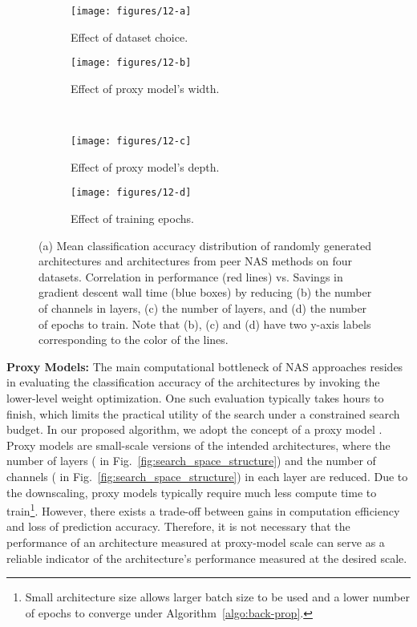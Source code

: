 \documentclass[journal]{IEEEtran}
\theoremstyle{definition}
\theoremstyle{remark}
\begin{document}
\begin{figure}[t]
	\centering
	\begin{subfigure}[t]{.24\textwidth}
		\centering
		\texttt{[image: figures/12-a]}
		\caption{Effect of dataset choice.\label{fig:which_dataset_to_search}}
	\end{subfigure}
	\begin{subfigure}[t]{.24\textwidth}
		\centering
		\texttt{[image: figures/12-b]}
		\caption{Effect of proxy model's width.\label{fig:proxy_width}}
	\end{subfigure}\\
	\begin{subfigure}[t]{.24\textwidth}
		\centering
		\texttt{[image: figures/12-c]}
		\caption{Effect of proxy model's depth.\label{fig:proxy_depth}}
	\end{subfigure}
	\begin{subfigure}[t]{.24\textwidth}
		\centering
		\texttt{[image: figures/12-d]}
		\caption{Effect of training epochs.\label{fig:proxy_epoch}}
	\end{subfigure}
	\caption{(a) Mean classification accuracy distribution of randomly generated architectures and architectures from peer NAS methods on four datasets. Correlation in performance (red lines) vs. Savings in gradient descent wall time (blue boxes) by reducing (b) the number of channels in layers, (c) the number of layers, and (d) the number of epochs to train. Note that (b), (c) and (d) have two y-axis labels corresponding to the color of the lines.
	\label{fig:proxy}\vspace{-0.3cm}}
\end{figure}

\vspace{3pt}
\noindent\textbf{Proxy Models:} The main computational bottleneck of NAS approaches resides in evaluating the classification accuracy of the architectures by invoking the lower-level weight optimization. One such evaluation typically takes hours to finish, which limits the practical utility of the search under a constrained search budget. In our proposed algorithm, we adopt the concept of a proxy model \cite{nasnet2018,real2019regularized}. Proxy models are small-scale versions of the intended architectures, where the number of layers ( in Fig.~\ref{fig:search_space_structure}) and the number of channels ( in Fig.~\ref{fig:search_space_structure}) in each layer are reduced. Due to the downscaling, proxy models typically require much less compute time to train\footnote{Small architecture size allows larger batch size to be used and a lower number of epochs to converge under Algorithm~\ref{algo:back-prop}.}. However, there exists a trade-off between gains in computation efficiency and loss of  prediction accuracy. Therefore, it is not necessary that the performance of an architecture measured at proxy-model scale can serve as a reliable indicator of the architecture's performance measured at the desired scale.
\end{document}
